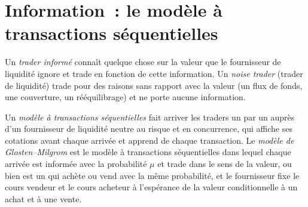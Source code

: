 \section{Information~: le modèle à transactions séquentielles}

\begin{definition}\label{def:mx:why-there-is-a-spread:informed}
Un \emph{trader informé} connaît quelque chose sur la valeur que le fournisseur de liquidité ignore et trade en fonction de cette information. Un \emph{noise
trader} (trader de liquidité) trade pour des raisons sans rapport avec la valeur (un flux de fonds, une couverture, un rééquilibrage) et ne porte aucune information.
\end{definition}

\begin{definition}\label{def:mx:why-there-is-a-spread:gm}
Un \emph{modèle à transactions séquentielles} fait arriver les traders un par un auprès d'un fournisseur de liquidité neutre au risque et en concurrence, qui
affiche ses cotations avant chaque arrivée et apprend de chaque transaction. Le \emph{modèle de Glosten--Milgrom} est le modèle à transactions séquentielles dans lequel
chaque arrivée est informée avec la probabilité $\mu$ et trade dans le sens de la valeur, ou bien est un  qui achète ou vend avec la même probabilité, et
le fournisseur fixe le cours vendeur et le cours acheteur à l'espérance de la valeur conditionnelle à un achat et à une vente.
\end{definition}

\begin{omfigure}

\label{fig:mx:why-there-is-a-spread:tree}
\end{omfigure}

